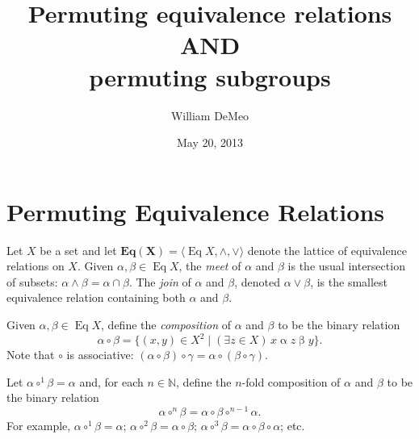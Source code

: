 \documentclass[11pt,reqno]{amsart}
\theoremstyle{plain}
\theoremstyle{definition}
\theoremstyle{remark}
\newcommand{\<}{\ensuremath{\langle}}
\renewcommand{\>}{\ensuremath{\rangle}}
\newcommand{\N}{\ensuremath{\mathbb{N}}}
\newcommand{\rel}[1]{\ensuremath{\mathbin{#1}}}
\newcommand{\meet}{\ensuremath{\wedge}}
\newcommand{\join}{\ensuremath{\vee}}
\newcommand{\Eq}{\ensuremath{\operatorname{Eq}}}
\newcommand{\bEqX}{\ensuremath{\mathbf{Eq(X)}}}
\newcommand{\circone}{\ensuremath{\circ^{1}}}
\newcommand{\circtwo}{\ensuremath{\circ^{2}}}
\newcommand{\circthree}{\ensuremath{\circ^{3}}}
\newcommand{\circfour}{\ensuremath{\circ^{4}}}
\newcommand{\circn}{\ensuremath{\circ^{n}}}
\begin{document}
\title[Permuting relations and permuting subgroups]{Permuting equivalence relations\\
AND\\
permuting subgroups}
\date{May 20, 2013}
\author{William DeMeo}
\address{Department of Mathematics\\
University of South Carolina\\Columbia 29208\\USA}


\maketitle

\section{Permuting Equivalence Relations}
Let $X$ be a set and let $\bEqX = \<\Eq X, \meet, \join\>$ denote the lattice of equivalence relations on
$X$.  
Given $\alpha, \beta \in \Eq X$, the \emph{meet} of $\alpha$ and $\beta$ is the usual intersection of subsets:
$\alpha \meet \beta = \alpha \cap \beta$. The \emph{join} 
of $\alpha$ and $\beta$,
denoted $\alpha \join \beta$, is the smallest equivalence relation containing
both $\alpha$ and $\beta$.

Given $\alpha, \beta \in \Eq X$, define the \emph{composition} of $\alpha$ and
$\beta$ to be the binary relation
\[
\alpha \circ \beta = \{(x,y)\in X^2 \mid (\exists z\in X) \, x \rel{\alpha} z \rel{\beta} y\}.
\]
Note that
$\circ$ is associative:
$(\alpha \circ \beta) \circ \gamma = \alpha \circ (\beta \circ \gamma)$.

Let $\alpha \circone \beta = \alpha$ and, for each $n\in \N$, define the
$n$-fold composition of $\alpha$ and $\beta$ to be the binary relation
\[
\alpha \circn \beta = \alpha \circ \beta  \circ^{n-1} \alpha .
\]
For example,
$\alpha \circone \beta = \alpha$; 
$\alpha \circtwo \beta = \alpha\circ \beta$; 
$\alpha \circthree \beta = \alpha\circ \beta \circ \alpha$; etc.
\end{document}
